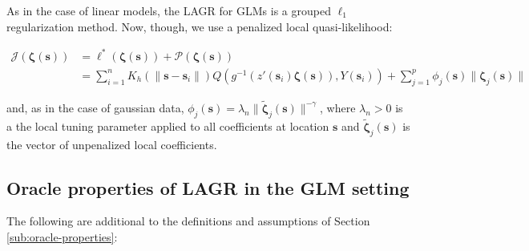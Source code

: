 \documentclass[authoryear,review, 12pt]{elsarticle}
\begin{document}
As in the case of linear models, the LAGR for GLMs is a grouped $\ell_{1}$
regularization method. Now, though, we use a penalized local quasi-likelihood:

\begin{align}
\mathcal{J}\left(\bm{\zeta}(\bm{s})\right) & =\mathcal{\ell}^{*}\left(\bm{\zeta}(\bm{s})\right)+\mathcal{P}\left(\bm{\zeta}(\bm{s})\right)\label{eq:adaptive-lasso-GLLM}\\
 & =\sum_{i=1}^{n}K_{h}\left(\|\bm{s}-\bm{s}_{i}\|\right)Q\left(g^{-1}\left(z'(\bm{s}_{i})\bm{\zeta}(\bm{s})\right),Y(\bm{s}_{i})\right)+\sum_{j=1}^{p}\phi_{j}\left(\bm{s}\right)\|\bm{\zeta}_{j}\left(\bm{s}\right)\|
\end{align}


and, as in the case of gaussian data, $\phi_{j}\left(\bm{s}\right)=\lambda_{n}\|\tilde{\bm{\zeta}}_{j}\left(\bm{s}\right)\|^{-\gamma}$,
where $\lambda_{n}>0$ is a the local tuning parameter applied to
all coefficients at location $\bm{s}$ and $\tilde{\bm{\zeta}}_{j}\left(\bm{s}\right)$
is the vector of unpenalized local coefficients.


\subsection{Oracle properties of LAGR in the GLM setting}

The following are additional to the definitions and assumptions of
Section \ref{sub:oracle-properties}:
\end{document}
